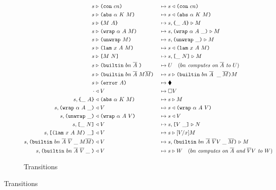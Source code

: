 \begin{figure}[!ht]
\begin{subfigure}[c]{\linewidth}   %
{\small
\caption{Transitions}
     \begin{alignat*}{2}
      s &\compute \con{cn}                 &{}\mapsto{}& s \return \con{cn}\\
      s &\compute \abs{\alpha}{K}{M}       &{}\mapsto{}& s \return \abs{\alpha}{K}{M}\\
      s &\compute \inst{M}{A}              &{}\mapsto{}& s,\inInstLeftFrame{A} \compute M\\
      s &\compute \wrap{\alpha}{A}{M}      &{}\mapsto{}& s,\inWrapRightFrame{\alpha}{A} \compute M\\
      s &\compute \unwrap{M}               &{}\mapsto{}& s,\inUnwrapFrame{} \compute M\\
      s &\compute \lam{x}{A}{M}            &{}\mapsto{}& s \return \lam{x}{A}{M}\\
      s &\compute \app{M}{N}               &{}\mapsto{}& s,\inAppLeftFrame{N} \compute M\\
      s &\compute \builtin{bn}{\repetition{A}}{} &{}\mapsto{}& 
                                      U \quad (\textit{$bn$ computes on $\repetition{A}$ to $U$})\\
      s &\compute \builtin{bn}{\repetition{A}}{M \repetition{M}} &{}\mapsto{}& 
                                      s \compute \inBuiltin{bn}{\repetition{A}}{}{\_}{\repetition{M}}{M}\\
      s &\compute \error{A} &{}\mapsto{}& \ckerror{}\\
      \cdot &\return V &{}\mapsto{}& \square V\\
      s,\inInstLeftFrame{A} &\return \abs{\alpha}{K}{M} &{}\mapsto{}& s \compute{M} \\
      s,\inWrapRightFrame{\alpha}{A} &\return V         &{}\mapsto{}& s \return \wrap{\alpha}{A}{V}\\
      s,\inUnwrapFrame{} &\return {\wrap{\alpha}{A}{V}} &{}\mapsto{}& s \return V\\
      s,\inAppLeftFrame{N} &\return V                   &{}\mapsto{}& s, \inAppRightFrame{V} \compute N\\
      s,\inAppRightFrame{\lam{x}{A}{M}} &\return V      &{}\mapsto{}& s \compute \subst{V}{x}{M}\\
      s,  \inBuiltin{bn}{\repetition{A}}{\repetition{V}}{\_}{M \repetition{M}} &\return V &{}\mapsto{}& s, \inBuiltin{bn}{\repetition{A}}{\repetition{V} V}{\_}{\repetition{M}} \compute M\\
      s,\inBuiltin{bn}{\repetition{A}}{\repetition{V}}{\_}{} &\return V &{}\mapsto{}& s \compute W \quad (\textit{$bn$ computes on $\repetition{A}$ and $\repetition{V}V$ to $W$})\\
    \end{alignat*}
}
\end{subfigure}
\end{figure}


